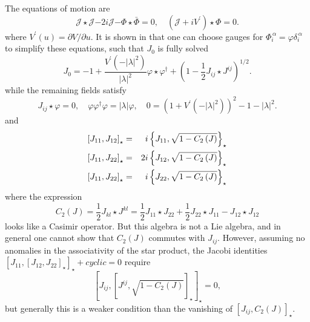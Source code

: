 \documentclass[a4paper,12pt]{article}
\begin{document}
The equations of motion are
\begin{equation}
\mathcal{J}\star \mathcal{J}\mathbf{-}2i\mathcal{J}\mathbf{-}\Phi
\star \bar{ \Phi}\mathbf{=}0,\quad \left( \mathcal{J}+iV^{\prime
}\right) \star \Phi =0. \label{generaleq}
\end{equation}
where $V^{\prime }\left( u\right) =\partial V/\partial u$. It is shown in
\cite{NCu11} that one can choose gauges for $\Phi _{i}^{\,\alpha }=\varphi
\delta _{i}^{\,\alpha }$ to simplify these equations, such that $J_{0}$ is
fully solved
\begin{equation}
J_{0}=-1+\frac{V^{\prime }\left( -\left| \lambda \right|
^{2}\right) }{ \left| \lambda \right| ^{2}}\varphi \star \varphi
^{\dagger }+\left( 1-\frac{ 1}{2}J_{ij}\star J^{ij}\right) ^{1/2}.
\label{Jo}
\end{equation}
while the remaining fields satisfy
\begin{equation}
J_{ij}\star \varphi =0,\quad \varphi \varphi ^{\dagger }\varphi =\left|
\lambda \right| \varphi ,\quad 0=\left( 1+V^{\prime }\left( -\left| \lambda
\right| ^{2}\right) \right) ^{2}-1-\left| \lambda \right| ^{2}.
\end{equation}
and
\begin{eqnarray}
\left[ J_{11},J_{12}\right] _{\star } &=&i\left\{ J_{11},\sqrt{1-C_{2}\left(
J\right) }\right\} _{\star }  \label{s1} \\
\left[ J_{11},J_{22}\right] _{\star } &=&2i\left\{ J_{12},\sqrt{%
1-C_{2}\left( J\right) }\right\} _{\star }  \label{s2} \\
\left[ J_{11},J_{22}\right] _{\star } &=&i\left\{ J_{22},\sqrt{1-C_{2}\left(
J\right) }\right\} _{\star }  \label{s3}
\end{eqnarray}
where the expression
\begin{equation}
C_{2}\left( J\right) =\frac{1}{2}J_{kl}\star J^{kl}=\frac{1}{2}J_{11}\star
J_{22}+\frac{1}{2}J_{22}\star J_{11}-J_{12}\star J_{12}
\end{equation}
looks like a Casimir operator. But this algebra is not a Lie algebra, and in
general one cannot show that $C_{2}\left( J\right) $ commutes with $J_{ij}.$
However, assuming no anomalies in the associativity of the star product, the
Jacobi identities $\left[ J_{11},\left[ J_{12},J_{22}\right] _{\star }\right]
_{\star }+cyclic=0$ require
\begin{equation}
\left[ J_{ij},\left[ J^{ij},\sqrt{1-C_{2}\left( J\right) }\right]
_{\star } \right] _{\star }=0,  \label{assoc}
\end{equation}
but generally this is a weaker condition than the vanishing of $\left[
J_{ij},C_{2}\left( J\right) \right] _{\star }.$
\end{document}
